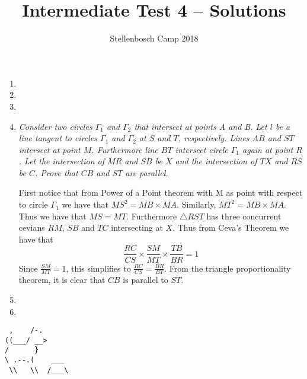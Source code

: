 \documentclass{article}
\title{Intermediate Test 4 -- Solutions}
\author{Stellenbosch Camp 2018}
\date{\vspace{-12pt}}
\begin{document}
\maketitle

\begin{enumerate}[1.]

\item %

\vspace{12pt}
\item 



\vspace{12pt}
\item %



\vspace{6pt}
\item %
\textit{Consider two circles $\Gamma_1$ and $\Gamma_2$ that intersect at points A and B. Let $l$ be a line tangent to circles $\Gamma_1$ and $\Gamma_2$ at $S$ and $T$, respectively. Lines $AB$ and $ST$ intersect at point $M$. Furthermore line $BT$ intersect circle $\Gamma_1$ again at point $R$. Let the intersection of $MR$ and $SB$ be $X$ and the intersection of $TX$ and $RS$ be $C$. 
Prove that $CB$ and $ST$ are parallel.}

First notice that from Power of a Point theorem with M as point with respect to circle $\Gamma_1$ we have that $MS^2 = MB \times MA$. Similarly, $MT^2 = MB \times MA$. Thus we have that $MS = MT$. Furthermore $\triangle RST$ has three concurrent cevians $RM$, $SB$ and $TC$ intersecting at $X$. Thus from Ceva's Theorem we have that $$\frac{RC}{CS} \times \frac{SM}{MT} \times \frac{TB}{BR} = 1$$
Since $\frac{SM}{MT} = 1$, this simplifies to $\frac{RC}{CS} = \frac{BR}{BT}$. From the triangle proportionality theorem, it is clear that $CB$ is parallel to $ST$.

\vspace{6pt}
\item %




\vspace{6pt}
\item %





\end{enumerate}


\vfill
\centering
\begin{BVerbatim}
 ,    /-.
((___/ __>
/      }
\ .--.(    ___
 \\   \\  /___\
\end{BVerbatim}
\end{document}
